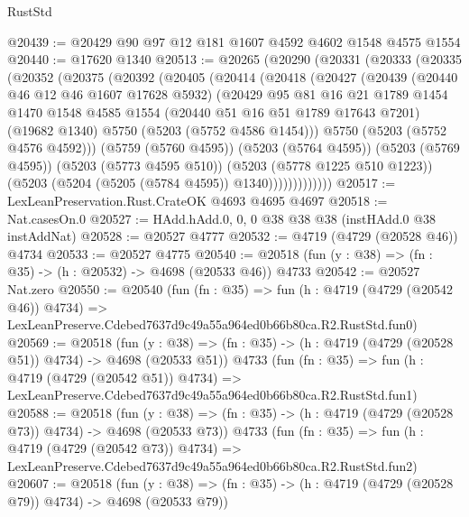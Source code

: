 \begin{lexlean}{RustStd}
\begin{coremodule}
@20439 := @20429 @90 @97 @12 @181 @1607 @4592 @4602 @1548 @4575 @1554
@20440 := @17620 @1340
@20513 := @20265
    (@20290
      (@20331
        (@20333
          (@20335
            (@20352
              (@20375
                (@20392
                  (@20405
                    (@20414
                      (@20418
                        (@20427
                          (@20439
                            (@20440 @46 @12 @46 @1607 @17628 @5932)
                            (@20429
                              @95
                              @81
                              @16
                              @21
                              @1789
                              @1454
                              @1470
                              @1548
                              @4585
                              @1554
                              (@20440 @51 @16 @51 @1789 @17643 @7201)
                              (@19682 @1340)
                              @5750
                              (@5203 (@5752 @4586 @1454)))
                            @5750
                            (@5203 (@5752 @4576 @4592)))
                          (@5759 (@5760 @4595))
                          (@5203 (@5764 @4595))
                          (@5203 (@5769 @4595))
                          (@5203 (@5773 @4595 @510))
                          (@5203 (@5778 @1225 @510 @1223))
                          (@5203 (@5204 (@5205 (@5784 @4595)) @1340)))))))))))))
@20517 := LexLeanPreservation.Rust.CrateOK @4693 @4695 @4697
@20518 := Nat.casesOn.{0}
@20527 := HAdd.hAdd.{0, 0, 0} @38 @38 @38 (instHAdd.{0} @38 instAddNat)
@20528 := @20527 @4777
@20532 := @4719 (@4729 (@20528 @46)) @4734
@20533 := @20527 @4775
@20540 := @20518 (fun (y : @38) => (fn : @35) -> (h : @20532) -> @4698 (@20533 @46)) @4733
@20542 := @20527 Nat.zero
@20550 := @20540
    (fun (fn : @35) =>
    fun (h : @4719 (@4729 (@20542 @46)) @4734) =>
    LexLeanPreserve.Cdebed7637d9c49a55a964ed0b66b80ca.R2.RustStd.fun0)
@20569 := @20518
    (fun (y : @38) => (fn : @35) -> (h : @4719 (@4729 (@20528 @51)) @4734) -> @4698 (@20533 @51))
    @4733
    (fun (fn : @35) =>
    fun (h : @4719 (@4729 (@20542 @51)) @4734) =>
    LexLeanPreserve.Cdebed7637d9c49a55a964ed0b66b80ca.R2.RustStd.fun1)
@20588 := @20518
    (fun (y : @38) => (fn : @35) -> (h : @4719 (@4729 (@20528 @73)) @4734) -> @4698 (@20533 @73))
    @4733
    (fun (fn : @35) =>
    fun (h : @4719 (@4729 (@20542 @73)) @4734) =>
    LexLeanPreserve.Cdebed7637d9c49a55a964ed0b66b80ca.R2.RustStd.fun2)
@20607 := @20518
    (fun (y : @38) => (fn : @35) -> (h : @4719 (@4729 (@20528 @79)) @4734) -> @4698 (@20533 @79))

\end{coremodule}
\end{lexlean}
